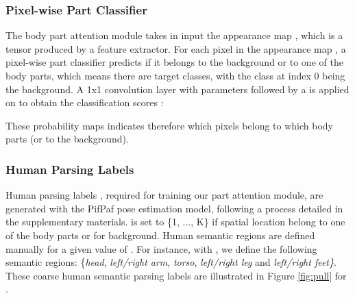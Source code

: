\documentclass[10pt,twocolumn,letterpaper]{article}
\begin{document}
\subsubsection{Pixel-wise Part Classifier} \label{section:parts_classifier}
The body part attention module takes in input the appearance map , which is a tensor  produced by a feature extractor.
For each pixel  in the appearance map , a pixel-wise part classifier predicts if it belongs to the background or to one of the  body parts, which means there are  target classes, with the class at index 0 being the background.
A 1x1 convolution layer with parameters  followed by a  is applied on  to obtain the classification scores :
{\small{

}}
These  probability maps  indicates therefore which pixels belong to which body parts (or to the background).





\subsubsection{Human Parsing Labels} \label{section:labels}
Human parsing labels  , required for training our part attention module, are generated with the PifPaf \cite{pifpaf} pose estimation model, following a process detailed in the supplementary materials.
 is set to \{1, ..., K\} if spatial location  belong to one of the  body parts or  for background.
Human semantic regions are defined manually for a given value of .
For instance, with , we define the following semantic regions: \{\textit{head}, \textit{left/right arm}, \textit{torso}, \textit{left/right leg} and \textit{left/right feet\}}.
These coarse human semantic parsing labels are illustrated in Figure \ref{fig:pull} for .
\end{document}
